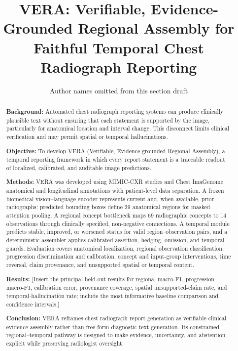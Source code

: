 \documentclass[preprint,12pt]{elsarticle}
\begin{document}
\begin{frontmatter}

\title{VERA: Verifiable, Evidence-Grounded Regional Assembly for Faithful
Temporal Chest Radiograph Reporting}

\author{Author names omitted from this section draft}

\begin{abstract}
\textbf{Background:} Automated chest radiograph reporting systems can produce
clinically plausible text without ensuring that each statement is supported by
the image, particularly for anatomical location and interval change. This
disconnect limits clinical verification and may permit spatial or temporal
hallucinations.

\textbf{Objective:} To develop VERA (Verifiable, Evidence-grounded Regional
Assembly), a temporal reporting framework in which every report statement is a
traceable readout of localized, calibrated, and auditable image predictions.

\textbf{Methods:} VERA was developed using MIMIC-CXR studies and Chest ImaGenome
anatomical and longitudinal annotations with patient-level data separation. A
frozen biomedical vision--language encoder represents current and, when
available, prior radiographs; predicted bounding boxes define 29 anatomical
regions for masked attention pooling. A regional concept bottleneck maps 69
radiographic concepts to 14 observations through clinically specified,
non-negative connections. A temporal module predicts stable, improved, or
worsened status for valid region--observation pairs, and a deterministic
assembler applies calibrated assertion, hedging, omission, and temporal guards.
Evaluation covers anatomical localization, regional observation classification,
progression discrimination and calibration, concept and input-group
interventions, time reversal, claim provenance, and unsupported spatial or
temporal content.

\textbf{Results:} [Insert the principal held-out results for regional macro-F1,
progression macro-F1, calibration error, provenance coverage, spatial
unsupported-claim rate, and temporal-hallucination rate; include the most
informative baseline comparison and confidence intervals.]

\textbf{Conclusion:} VERA reframes chest radiograph report generation as
verifiable clinical evidence assembly rather than free-form diagnostic text
generation. Its constrained regional--temporal pathway is designed to make
evidence, uncertainty, and abstention explicit while preserving radiologist
oversight.
\end{abstract}

\end{frontmatter}
\end{document}
